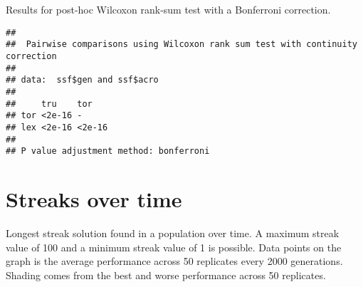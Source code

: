 \documentclass[]{book}
\newenvironment{Shaded}{\begin{snugshade}}{\end{snugshade}}
\newcommand{\DataTypeTok}[1]{\textcolor[rgb]{0.13,0.29,0.53}{#1}}
\newcommand{\KeywordTok}[1]{\textcolor[rgb]{0.13,0.29,0.53}{\textbf{#1}}}
\newcommand{\NormalTok}[1]{#1}
\newcommand{\OperatorTok}[1]{\textcolor[rgb]{0.81,0.36,0.00}{\textbf{#1}}}
\newcommand{\OtherTok}[1]{\textcolor[rgb]{0.56,0.35,0.01}{#1}}
\newcommand{\StringTok}[1]{\textcolor[rgb]{0.31,0.60,0.02}{#1}}
\begin{document}
Results for post-hoc Wilcoxon rank-sum test with a Bonferroni correction.

\begin{Shaded}
\end{Shaded}

\begin{verbatim}
## 
##  Pairwise comparisons using Wilcoxon rank sum test with continuity correction 
## 
## data:  ssf$gen and ssf$acro 
## 
##     tru    tor   
## tor <2e-16 -     
## lex <2e-16 <2e-16
## 
## P value adjustment method: bonferroni
\end{verbatim}

\hypertarget{streaks-over-time}{%
\section{Streaks over time}\label{streaks-over-time}}

Longest streak solution found in a population over time.
A maximum streak value of 100 and a minimum streak value of 1 is possible.
Data points on the graph is the average performance across 50 replicates every 2000 generations.
Shading comes from the best and worse performance across 50 replicates.

\begin{Shaded}
\end{Shaded}
\end{document}
